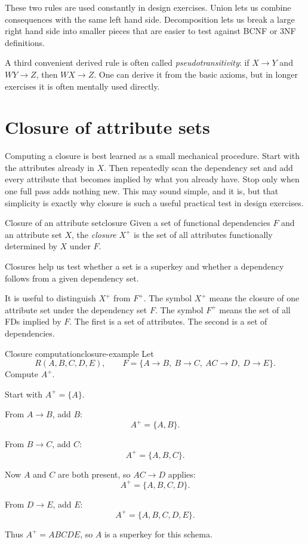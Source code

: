 \documentclass[11pt,a4paper,openany]{book}
\begin{document}
These two rules are used constantly in design exercises. Union lets us combine consequences with the same left hand side. Decomposition lets us break a large right hand side into smaller pieces that are easier to test against BCNF or 3NF definitions.

A third convenient derived rule is often called \emph{pseudotransitivity}:
if \(X \to Y\) and \(WY \to Z\), then \(WX \to Z\).
One can derive it from the basic axioms, but in longer exercises it is often mentally used directly.

\section{Closure of attribute sets}
Computing a closure is best learned as a small mechanical procedure. Start with the attributes already in \(X\). Then repeatedly scan the dependency set and add every attribute that becomes implied by what you already have. Stop only when one full pass adds nothing new. This may sound simple, and it is, but that simplicity is exactly why closure is such a useful practical test in design exercises.

\begin{definition}{Closure of an attribute set}{closure}
Given a set of functional dependencies \(F\) and an attribute set \(X\), the \emph{closure} \(X^+\) is the set of all attributes functionally determined by \(X\) under \(F\).
\end{definition}

Closures help us test whether a set is a superkey and whether a dependency follows from a given dependency set.

It is useful to distinguish \(X^+\) from \(F^+\).
The symbol \(X^+\) means the closure of one attribute set under the dependency set \(F\).
The symbol \(F^+\) means the set of all FDs implied by \(F\).
The first is a set of attributes. The second is a set of dependencies.

\begin{example}{Closure computation}{closure-example}
Let
\[
R(A,B,C,D,E),\qquad
F=\{A\to B,\ B\to C,\ AC\to D,\ D\to E\}.
\]
Compute \(A^+\).

Start with \(A^+=\{A\}\).

From \(A\to B\), add \(B\):
\[
A^+=\{A,B\}.
\]

From \(B\to C\), add \(C\):
\[
A^+=\{A,B,C\}.
\]

Now \(A\) and \(C\) are both present, so \(AC\to D\) applies:
\[
A^+=\{A,B,C,D\}.
\]

From \(D\to E\), add \(E\):
\[
A^+=\{A,B,C,D,E\}.
\]

Thus \(A^+=ABCDE\), so \(A\) is a superkey for this schema.
\end{example}
\end{document}
